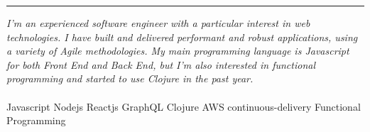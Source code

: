 \documentclass[9pt]{stackoverflow} %
\begin{document}

\textcolor{stackoverflow}{\hrule}
\begin{minipage}[t]{0.25\textwidth}
	\vspace{\baselineskip} %
\end{minipage}
\begin{minipage}[t]{0.75\textwidth}
	\vspace{\baselineskip} %
	{\normalsize\emph{I'm an experienced software engineer with a particular interest in web technologies.
	I have built and delivered performant and robust applications, using a variety of Agile methodologies.
	My main programming language is Javascript for both Front End and Back End, but I'm also interested in functional programming and started to use Clojure in the past year.
	}}\\\\
	{\small
			{Javascript Nodejs Reactjs GraphQL Clojure AWS continuous-delivery Functional Programming\\}
	}
\end{minipage}

\end{document}

